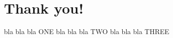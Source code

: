 \documentclass{book}
\begin{document}
\chapter{Thank you!}
bla bla bla ONE
\newpage
bla bla bla TWO
\newpage
bla bla bla THREE
\end{document}
